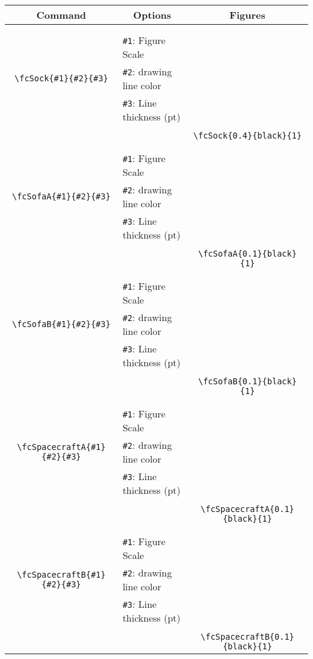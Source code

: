 \documentclass[x11names]{article}
\begin{document}
\begin{table}[H]\centering\begin{tabular}{|c|l|c|}\hline {\bf Command}& \multicolumn{1}{c|}{{\bf Options}} & {\bf Figures}\\  \hline	&&\multirow{5}{*}{\fcSock{0.4}{black}{1}}\\	&&\\	&\verb|#1|: Figure Scale &\\	\verb|\fcSock{#1}{#2}{#3}|&	\verb|#2|: drawing line color &\\	&\verb|#3|: Line thickness (pt) &\\ &&\\&&	\verb|\fcSock{0.4}{black}{1}|\\\hline 	
	&&\multirow{5}{*}{\fcSofaA{0.1}{black}{1}}\\	&&\\	&\verb|#1|: Figure Scale &\\	\verb|\fcSofaA{#1}{#2}{#3}|&	\verb|#2|: drawing line color &\\	&\verb|#3|: Line thickness (pt) &\\ &&\\&&	\verb|\fcSofaA{0.1}{black}{1}|\\\hline 	
	&&\multirow{5}{*}{\fcSofaB{0.1}{black}{1}}\\	&&\\	&\verb|#1|: Figure Scale &\\	\verb|\fcSofaB{#1}{#2}{#3}|&	\verb|#2|: drawing line color &\\	&\verb|#3|: Line thickness (pt) &\\ &&\\&&	\verb|\fcSofaB{0.1}{black}{1}|\\\hline 	
	&&\multirow{5}{*}{\fcSpacecraftA{0.1}{black}{1}}\\	&&\\	&\verb|#1|: Figure Scale &\\	\verb|\fcSpacecraftA{#1}{#2}{#3}|&	\verb|#2|: drawing line color &\\	&\verb|#3|: Line thickness (pt) &\\ &&\\&&	\verb|\fcSpacecraftA{0.1}{black}{1}|\\\hline 	
	&&\multirow{5}{*}{\fcSpacecraftB{0.1}{black}{1}}\\	&&\\	&\verb|#1|: Figure Scale &\\	\verb|\fcSpacecraftB{#1}{#2}{#3}|&	\verb|#2|: drawing line color &\\	&\verb|#3|: Line thickness (pt) &\\ &&\\&&	\verb|\fcSpacecraftB{0.1}{black}{1}|\\\hline 	

\end{tabular}
\end{table}
\end{document}
